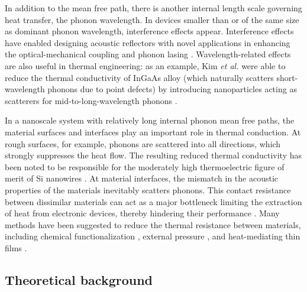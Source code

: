 In addition to the mean free path, there is another internal length scale governing heat transfer, the phonon wavelength. In devices smaller than or of the same size as dominant phonon wavelength, interference effects appear. Interference effects have enabled designing acoustic reflectors with novel applications in enhancing the optical-mechanical coupling \cite{fainstein13} and phonon lasing \cite{maryam13}. Wavelength-related effects are also useful in thermal engineering: as an example, Kim \textit{et al.} were able to reduce the thermal conductivity of InGaAs alloy (which naturally scatters short-wavelength phonons due to point defects) by introducing nanoparticles acting as scatterers for mid-to-long-wavelength phonons \cite{kim06}. %

In a nanoscale system with relatively long internal phonon mean free paths, the material surfaces and interfaces play an important role in thermal conduction. At rough surfaces, for example, phonons are scattered into all directions, which strongly suppresses the heat flow. The resulting reduced thermal conductivity has been noted to be responsible for the moderately high thermoelectric figure of merit of Si nanowires \cite{hochbaum08}. At material interfaces, the mismatch in the acoustic properties of the materials inevitably scatters phonons.  This contact resistance between dissimilar materials can act as a major bottleneck limiting the extraction of heat from electronic devices, thereby hindering their performance \cite{}. Many methods have been suggested to reduce the thermal resistance between materials, including chemical functionalization \cite{hopkins11,kaur14}, external pressure \cite{shen11,chalopin12}, and heat-mediating thin films \cite{}.

\subsection{Theoretical background}


